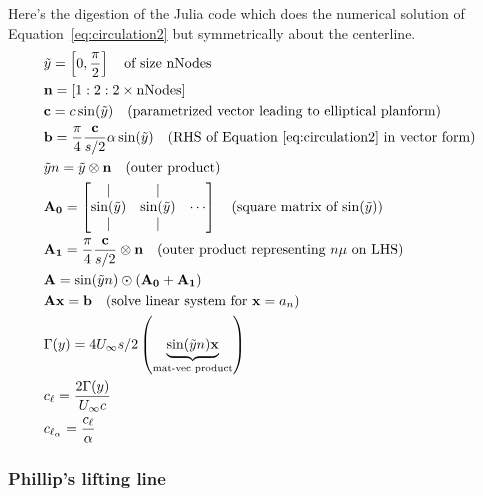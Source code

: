 \documentclass[10pt]{article}
\newcommand{\mbf}[1]{\mathbf{#1}}
\newcommand{\Uinf}{U_{\infty}}
\newcommand{\tn}[1]{\textrm{#1}}
\begin{document}
Here's the digestion of the Julia code which does the numerical solution of Equation~\eqref{eq:circulation2} but symmetrically about the centerline.
\begin{align*}
     & \tilde{y} = \left[
        0,\frac{\pi}{2}
        \right] \quad \tn{of size nNodes}
    \\
     & \mbf{n} = \left[1:2:2\times\tn{nNodes}\right]
    \\
     & \mbf{c} = c  \sin(\tilde{y}) \quad \tn{(parametrized vector leading to elliptical planform)}
    \\
     & \mbf{b} = \frac{\pi}{4} \frac{\mbf{c}}{s/2} \alpha \sin(\tilde{y}) \quad \tn{(RHS of Equation~\eqref{eq:circulation2} in vector form)}
    \\
     & \tilde{y}n = \tilde{y} \otimes \mbf{n} \quad \tn{(outer product)}
    \\
     & \mbf{A_0} = \begin{bmatrix}
                       |               & |                        \\
                       \sin(\tilde{y}) & \sin(\tilde{y}) & \cdots \\
                       |               & |
                   \end{bmatrix} \quad \tn{(square matrix of $\sin(\tilde{y})$)}
    \\
     & \mbf{A_1} = \frac{\pi}{4} \frac{\mbf{c}}{s/2} \otimes \mbf{n} \quad \tn{(outer product representing $n\mu$ on LHS)}
    \\
     & \mbf{A} = \sin(\tilde{y} n ) \odot \left( \mbf{A_0}+\mbf{A_1} \right)                                                                  \\
     & \mbf{A}\mbf{x} = \mbf{b} \quad \tn{(solve linear system for $\mbf{x} = a_n$)}                                                          \\
     & \Gamma(y) = 4 \Uinf s/2 \left(\underbrace{\sin(\tilde{y}n)\mbf{x} }_{\tn{mat-vec product}} \right)                                     \\
     & c_\ell = \frac{2\Gamma(y)}{\Uinf {c}}                                                                                                  \\
     & c_{\ell_{\alpha}} = \frac{c_\ell}{\alpha}
\end{align*}

\subsubsection{Phillip's lifting line}
\end{document}
